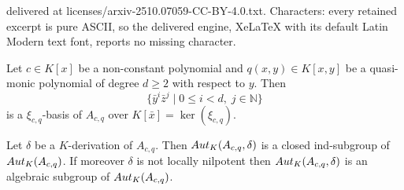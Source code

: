 \documentclass[10pt,a4paper]{amsart}
\newcommand \N {\mathbb{N}}
\newcommand \auto {{\rm Aut}}
\renewcommand \a {A}
\renewcommand \k {K}
\begin{document}
delivered at licenses/arxiv-2510.07059-CC-BY-4.0.txt. Characters: every retained excerpt is pure ASCII, so the delivered engine, XeLaTeX with its default Latin Modern text font, reports no missing character.
\begin{proposition}\label{xbasisProposition}Let $c\in\k[x]$ be a non-constant polynomial and $q(x,y)\in\k[x,y]$ be a quasi-monic polynomial of degree $d\geq 2$ with respect to $y$. Then 
	$$\big\{ \bar{y}^i\bar{z}^j\mid 0\leq i<d, \;j\in\N\}$$ is a $\xi_{c,q}$-basis of $\a_{c,q}$ over $\k[\bar{x}]=\ker(\xi_{c,q})$.
\end{proposition}

\begin{lemma}\label{closedSubgroup}Let $\delta$ be a $\k$-derivation of $\a_{c,q}$. Then $\auto_{\k}(\a_{c,q},\delta)$ is a closed ind-subgroup of $\auto_{\k}(\a_{c,q})$. If moreover $\delta$ is not locally nilpotent then $\auto_{\k}(\a_{c,q},\delta)$ is an algebraic subgroup of $\auto_{\k}(\a_{c,q})$.
\end{lemma}
\end{document}
